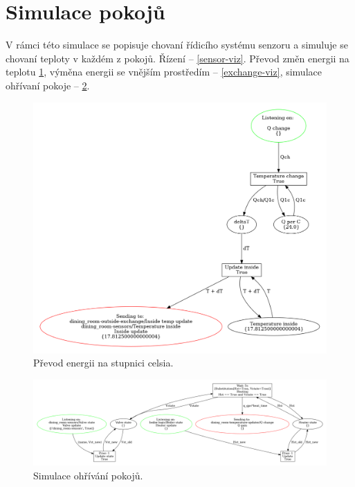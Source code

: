 \section{Simulace pokojů}

V rámci této simulace se popisuje chovaní řídicího systému senzoru a simuluje se chovaní teploty v každém z pokojů. Řízení -- \ref{sensor-viz}. Převod změn energii na teplotu \ref{room-temp-viz}, výměna energii se vnějším prostředím -- \ref{exchange-viz}, simulace ohřívaní pokoje -- \ref{heater-viz}. 

\begin{figure}[htb]
  \centering
  \includegraphics[width=\textwidth]{obrazky-figures/room-temp-upd.png}
  \caption{Převod energii na stupnici celsia.}
  \label{room-temp-viz}
\end{figure}

\begin{figure}[htb] %
  \centering
  \includegraphics[width=\textwidth]{obrazky-figures/room-heating.png}
  \caption{Simulace ohřívání pokojů.}
  \label{heater-viz}
\end{figure}

